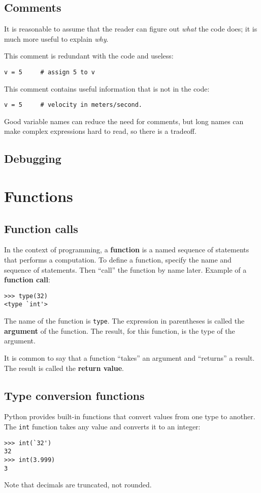 \documentclass{article}
\begin{document}
\subsection{Comments}
It is reasonable to assume that the reader can figure out
\emph{what} the code does; it is much more useful to explain
\emph{why}.

This comment is redundant with the code and useless:
\begin{verbatim}
v = 5     # assign 5 to v
\end{verbatim}
This comment contains useful information that is not in the code:
\begin{verbatim}
v = 5     # velocity in meters/second. 
\end{verbatim}
Good variable names can reduce the need for comments, but long names
can make complex expressions hard to read, so there is a tradeoff.

\subsection{Debugging}

\section{Functions}
\subsection{Function calls}
In the context of programming, a \textbf{function} is a named
sequence of statements that performs a computation.
To define a function, specify the name and sequence of
statements. Then ``call'' the function by name later.
Example of a \textbf{function call}:
\begin{verbatim}
>>> type(32)
<type `int'>
\end{verbatim}
The name of the function is \verb|type|. The expression in
parentheses is called the \textbf{argument} of the function.
The result, for this function, is the type of the argument.

It is common to say that a function ``takes'' an argument and
``returns'' a result. The result is called the \textbf{return value}.
\subsection{Type conversion functions}
Python provides built-in functions that convert values from
one type to another. The \verb|int| function takes any value
and converts it to an integer:
\begin{verbatim}
>>> int(`32')
32
>>> int(3.999)
3
\end{verbatim}
Note that decimals are truncated, not rounded.
\end{document}
